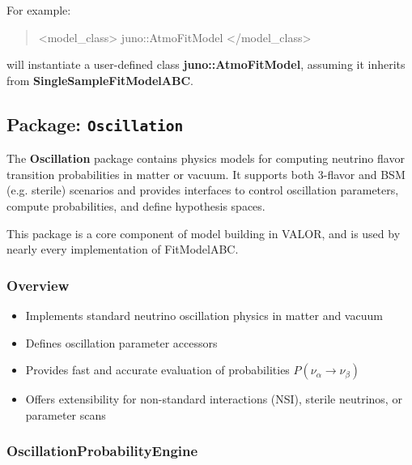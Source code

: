 For example:

\begin{quote}
{\color{amber}<model\_class>} {\color{cadmiumgreen} juno::AtmoFitModel} {\color{amber}</model\_class>}
\end{quote}

will instantiate a user-defined class {\color{cadmiumgreen} \textbf{juno::AtmoFitModel}}, assuming it inherits from {\color{cadmiumgreen} \textbf{SingleSampleFitModelABC}}.

%
%
%

\subsection{Package: \texttt{Oscillation}}

The {\color{cadmiumgreen} \textbf{Oscillation}} package contains physics models for computing neutrino flavor transition probabilities in matter or vacuum.  
It supports both 3-flavor and BSM (e.g. sterile) scenarios and provides interfaces to control oscillation parameters, compute probabilities, and define hypothesis spaces.

This package is a core component of model building in VALOR, and is used by nearly every implementation of {\color{cadmiumgreen} FitModelABC}.

\vspace{1em}
\subsubsection*{Overview}

\begin{itemize}
  \item Implements standard neutrino oscillation physics in matter and vacuum
  \item Defines oscillation parameter accessors
  \item Provides fast and accurate evaluation of probabilities $P(\nu_\alpha \rightarrow \nu_\beta)$
  \item Offers extensibility for non-standard interactions (NSI), sterile neutrinos, or parameter scans
\end{itemize}

\vspace{1em}
\subsubsection*{\color{cadmiumgreen}\bf OscillationProbabilityEngine}

